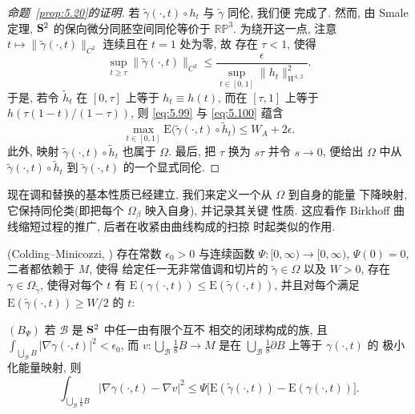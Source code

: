 \begin{proof}[命题~\ref{prop:5.20}的证明]
若 $\tilde{\gamma}(\cdot,t)\circ h_t$ 与 $\tilde{\gamma}$ 同伦, 我们便
完成了. 然而, 由 Smale 定理, $\mathbf{S}^2$ 的保向微分同胚空间同伦等价于
$\mathbb{RP}^3$. 为绕开这一点, 注意
$t\mapsto\|\tilde{\gamma}(\cdot,t)\|_{C^2}$ 连续且在 $t=1$ 处为零, 故
存在 $\tau<1$, 使得
\begin{equation}
\sup_{t\geq\tau}\|\tilde{\gamma}(\cdot,t)\|_{C^2}
\leq\frac{\epsilon}{\sup_{t\in[0,1]}\|h_t\|_{W^{1,2}}^2}.
\label{eq:5.100}
\end{equation}
于是, 若令 $\tilde{h}_t$ 在 $[0,\tau]$ 上等于 $h_t\equiv h(t)$, 而在
$[\tau,1]$ 上等于 $h(\tau(1-t)/(1-\tau))$, 则 \eqref{eq:5.99} 与
\eqref{eq:5.100} 蕴含
\begin{equation}
\max_{t\in[0,1]}\mathrm{E}\bigl(\tilde{\gamma}(\cdot,t)\circ\tilde{h}_t\bigr)
\leq W_A+2\epsilon.
\label{eq:5.101}
\end{equation}
此外, 映射 $\tilde{\gamma}(\cdot,t)\circ\tilde{h}_t$ 也属于 $\Omega$.
最后, 把 $\tau$ 换为 $s\tau$ 并令 $s\to0$, 便给出 $\Omega$ 中从
$\tilde{\gamma}(\cdot,t)\circ\tilde{h}_t$ 到 $\tilde{\gamma}(\cdot,t)$
的一个显式同伦.
\end{proof}

现在调和替换的基本性质已经建立, 我们来定义一个从 $\Omega$ 到自身的能量
下降映射, 它保持同伦类(即把每个 $\Omega_\beta$ 映入自身), 并记录其关键
性质. 这应看作 Birkhoff 曲线缩短过程的推广, 后者在收紧由曲线构成的扫掠
时起类似的作用.

\begin{theorem}
\label{thm:5.23}
(Colding--Minicozzi, \cite{CM27}) 存在常数 $\epsilon_0>0$ 与连续函数
$\Psi:[0,\infty)\to[0,\infty)$, $\Psi(0)=0$, 二者都依赖于 $M$, 使得
给定任一无非常值调和切片的 $\tilde{\gamma}\in\Omega$ 以及 $W>0$, 存在
$\gamma\in\Omega_{\tilde{\gamma}}$, 使得对每个 $t$ 有
$\mathrm{E}(\gamma(\cdot,t))\leq\mathrm{E}(\tilde{\gamma}(\cdot,t))$,
并且对每个满足 $\mathrm{E}(\tilde{\gamma}(\cdot,t))\geq W/2$ 的 $t$:

\medskip
\noindent$(B_\Psi)$ 若 $\mathcal{B}$ 是 $\mathbf{S}^2$ 中任一由有限个互不
相交的闭球构成的族, 且
$\int_{\bigcup_{\mathcal{B}}B}|\nabla\gamma(\cdot,t)|^2<\epsilon_0$, 而
$v:\bigcup_{\mathcal{B}}\frac18B\to M$ 是在
$\bigcup_{\mathcal{B}}\frac18\partial B$ 上等于 $\gamma(\cdot,t)$ 的
极小化能量映射, 则
\begin{equation*}
\int_{\bigcup_{\mathcal{B}}\frac18B}
\bigl|\nabla\gamma(\cdot,t)-\nabla v\bigr|^2
\leq\Psi\bigl[\mathrm{E}(\tilde{\gamma}(\cdot,t))
-\mathrm{E}(\gamma(\cdot,t))\bigr].
\end{equation*}
\end{theorem}

